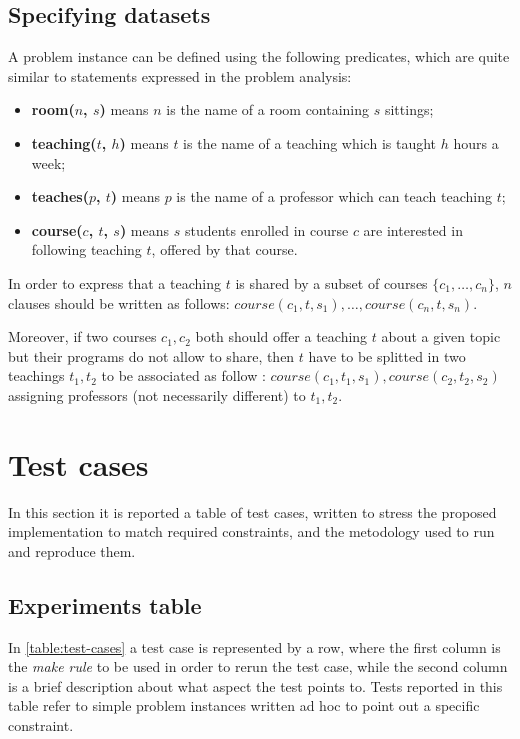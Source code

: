 \documentclass[10pt,a4paper]{article} %
\begin{document}
    \subsection{Specifying datasets}
    A problem instance can be defined using the following predicates, which
    are quite similar to statements expressed in the problem analysis:
    \begin{itemize}
        \item \textbf{room($n$, $s$)} means $n$ is the name
            of a room containing $s$ sittings;
        \item \textbf{teaching($t$, $h$)} means $t$ is the name
            of a teaching which is taught $h$ hours a week;
        \item \textbf{teaches($p$, $t$)} means $p$ is the name
            of a professor which can teach teaching $t$;
        \item \textbf{course($c$, $t$, $s$)} means $s$ students
            enrolled in course $c$ are interested in following
            teaching $t$, offered by that course.
    \end{itemize}
    In order to express that a teaching $t$ is shared by a subset of
    courses $\lbrace c_1, \ldots, c_n \rbrace$, $n$ clauses should be written
    as follows: $ course(c_1, t, s_1), \ldots, course(c_n, t, s_n)$.

    Moreover, if two courses $c_1, c_2$ both should offer a teaching $t$ about
    a given topic but their programs do not allow to share, then $t$
    have to be splitted in two teachings $t_1, t_2$ to be associated as follow :
    $course(c_1, t_1, s_1), course(c_2, t_2, s_2)$
    assigning professors (not necessarily different) to $t_1, t_2$.

    \section{Test cases}
    In this section it is reported a table of test cases, written to stress
    the proposed implementation to match required constraints,
    and the metodology used to run and reproduce them.

    \subsection{Experiments table}
    In \autoref{table:test-cases} a test case is represented by a row, where
    the first column is the \emph{make rule} to be used in order to rerun the
    test case, while the second column is a brief description about what
    aspect the test points to. Tests reported in this table refer to simple
    problem instances written ad hoc to point out a specific constraint.
\end{document}
